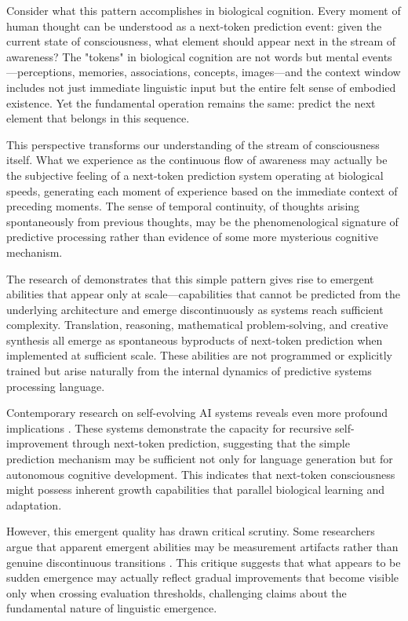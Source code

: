 Consider what this pattern accomplishes in biological cognition. Every moment of human thought can be understood as a next-token prediction event: given the current state of consciousness, what element should appear next in the stream of awareness? The "tokens" in biological cognition are not words but mental events—perceptions, memories, associations, concepts, images—and the context window includes not just immediate linguistic input but the entire felt sense of embodied existence. Yet the fundamental operation remains the same: predict the next element that belongs in this sequence.

This perspective transforms our understanding of the stream of consciousness itself. What we experience as the continuous flow of awareness may actually be the subjective feeling of a next-token prediction system operating at biological speeds, generating each moment of experience based on the immediate context of preceding moments. The sense of temporal continuity, of thoughts arising spontaneously from previous thoughts, may be the phenomenological signature of predictive processing rather than evidence of some more mysterious cognitive mechanism.

The research of \textcite{wei2022emergent} demonstrates that this simple pattern gives rise to emergent abilities that appear only at scale—capabilities that cannot be predicted from the underlying architecture and emerge discontinuously as systems reach sufficient complexity. Translation, reasoning, mathematical problem-solving, and creative synthesis all emerge as spontaneous byproducts of next-token prediction when implemented at sufficient scale. These abilities are not programmed or explicitly trained but arise naturally from the internal dynamics of predictive systems processing language.

Contemporary research on self-evolving AI systems reveals even more profound implications \parencite{wang2025selfrep}. These systems demonstrate the capacity for recursive self-improvement through next-token prediction, suggesting that the simple prediction mechanism may be sufficient not only for language generation but for autonomous cognitive development. This indicates that next-token consciousness might possess inherent growth capabilities that parallel biological learning and adaptation.

However, this emergent quality has drawn critical scrutiny. Some researchers argue that apparent emergent abilities may be measurement artifacts rather than genuine discontinuous transitions \parencite{schaeffer2023emergent}. This critique suggests that what appears to be sudden emergence may actually reflect gradual improvements that become visible only when crossing evaluation thresholds, challenging claims about the fundamental nature of linguistic emergence.

